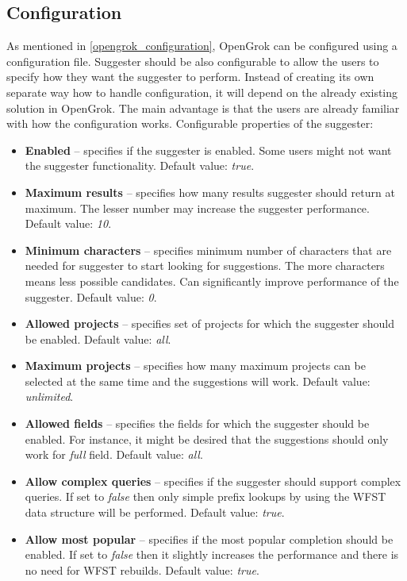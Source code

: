 \subsection{Configuration}
\label{suggester_config}
As mentioned in \ref{opengrok_configuration}, OpenGrok can be configured using a configuration file.
Suggester should be also configurable to allow the users to specify how they want the suggester to perform.
Instead of creating its own separate way how to handle configuration, it will depend on the already existing solution in
OpenGrok. The main advantage is that the users are already familiar with how the configuration works. Configurable
properties of the suggester:
\begin{itemize}
    \item \textbf{Enabled} – specifies if the suggester is enabled. Some users might not want the suggester functionality.
    Default value: \textit{true}.
    \item \textbf{Maximum results} – specifies how many results suggester should return at maximum. The lesser number may
    increase the suggester performance. Default value: \textit{10}.
    \item \textbf{Minimum characters} – specifies minimum number of characters that are needed for suggester to start looking
    for suggestions. The more characters means less possible candidates. Can significantly improve performance of the
    suggester. Default value: \textit{0}.
    \item \textbf{Allowed projects} – specifies set of projects for which the suggester should be enabled. Default value: \textit{all}.
    \item \textbf{Maximum projects} – specifies how many maximum projects can be selected at the same time and the suggestions will work.
    Default value: \textit{unlimited}.
    \item \textbf{Allowed fields} – specifies the fields for which the suggester should be enabled. For instance, it might be
    desired that the suggestions should only work for \textit{full} field. Default value: \textit{all}.
    \item \textbf{Allow complex queries} – specifies if the suggester should support complex queries. If set to
    \textit{false} then only simple prefix lookups by using the WFST data structure will be performed. Default value:
    \textit{true}.
    \item \textbf{Allow most popular} – specifies if the most popular completion should be enabled.
    If set to \textit{false} then it slightly increases the performance and there is no need for WFST rebuilds. Default value: \textit{true}.

\end{itemize}
